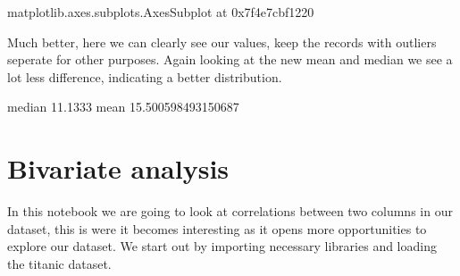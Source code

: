 \documentclass[letterpaper,10pt,english]{jupyterBook}
\begin{document}
\begin{sphinxVerbatim}[commandchars=\\\{\}]
\PYGZlt{}matplotlib.axes.\PYGZus{}subplots.AxesSubplot at 0x7f4e7cbf1220\PYGZgt{}
\end{sphinxVerbatim}

\noindent{}

\sphinxAtStartPar
Much better, here we can clearly see our values, keep the records with outliers seperate for other purposes.
Again looking at the new mean and median we see a lot less difference, indicating a better distribution.

\begin{sphinxVerbatim}[commandchars=\\\{\}]
\PYG{p}{[}\PYG{p}{]}
\PYG{p}{[}\PYG{p}{]}
\end{sphinxVerbatim}

\begin{sphinxVerbatim}[commandchars=\\\{\}]
median
11.1333
mean
15.500598493150687
\end{sphinxVerbatim}


\chapter{Bi\sphinxhyphen{}variate analysis}
\label{\detokenize{c5_data_exploration/bivariate_analysis:bi-variate-analysis}}\label{\detokenize{c5_data_exploration/bivariate_analysis::doc}}
\sphinxAtStartPar
In this notebook we are going to look at correlations between two columns in our dataset, this is were it becomes interesting as it opens more opportunities to explore our dataset. We start out by importing necessary libraries and loading the titanic dataset.
\end{document}
